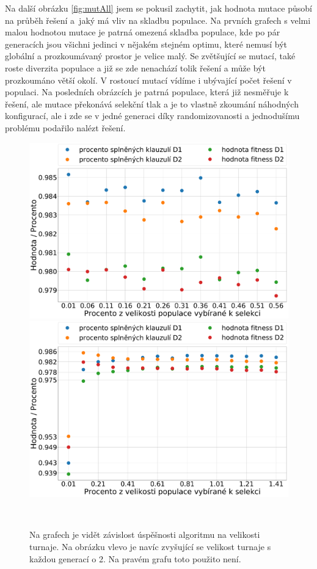 \documentclass[11pt]{article}
\begin{document}
Na další obrázku \ref{fig:mutAll} jsem se pokusil zachytit, jak hodnota mutace působí na průběh řešení a~jaký má vliv na skladbu populace. Na prvních grafech s velmi malou hodnotou mutace je patrná omezená skladba populace, kde po pár generacích jsou všichni jedinci v nějakém stejném optimu, které nemusí být globální a prozkoumávaný prostor je velice malý. Se zvětšující se mutací, také roste diverzita populace a již se zde nenachází tolik řešení a může být prozkoumáno větší okolí. V rostoucí mutací vídíme i ubývající počet řešení v populaci. Na posledních obrázcích je patrná populace, která již nesměřuje k řešení, ale mutace překonává selekční tlak a je to vlastně zkoumání náhodných konfigurací, ale i zde se v jedné generaci díky randomizovanosti a jednodušímu problému podařilo nalézt řešení. 

\begin{figure}
	\centering
    \begin{minipage}[c]{0.48\textwidth}
        \centering\includegraphics[width=\textwidth]{img/sat_s_small.pdf} 
    \end{minipage}
    \begin{minipage}[c]{0.48\textwidth}
        \centering \includegraphics[width=\textwidth]{img/sat_s_big.pdf} 
    \end{minipage}
    \\
   \caption{Na grafech je vidět závislost úspěšnosti algoritmu na velikosti turnaje. Na obrázku vlevo je navíc zvyšující se velikost turnaje s každou generací o 2. Na pravém grafu toto použito není.}\label{fig:sel}
\end{figure} 
\end{document}
